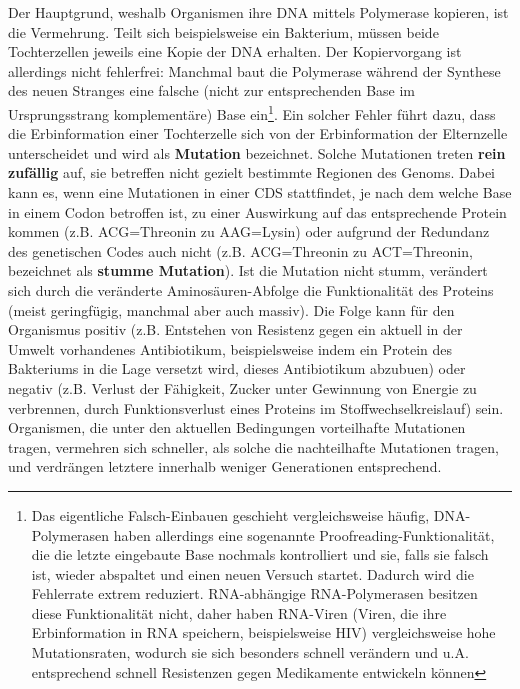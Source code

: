 Der Hauptgrund, weshalb Organismen ihre DNA mittels Polymerase kopieren, ist die Vermehrung. Teilt sich beispielsweise ein Bakterium, müssen beide Tochterzellen jeweils eine Kopie der DNA erhalten. Der Kopiervorgang ist allerdings nicht fehlerfrei: Manchmal baut die Polymerase während der Synthese des neuen Stranges eine falsche (nicht zur entsprechenden Base im Ursprungsstrang komplementäre) Base ein\footnote{Das eigentliche Falsch-Einbauen geschieht vergleichsweise häufig, DNA-Polymerasen haben allerdings eine sogenannte Proofreading-Funktionalität, die die letzte eingebaute Base nochmals kontrolliert und sie, falls sie falsch ist, wieder abspaltet und einen neuen Versuch startet. Dadurch wird die Fehlerrate extrem reduziert. RNA-abhängige RNA-Polymerasen besitzen diese Funktionalität nicht, daher haben RNA-Viren (Viren, die ihre Erbinformation in RNA speichern, beispielsweise HIV) vergleichsweise hohe Mutationsraten, wodurch sie sich besonders schnell verändern und u.A. entsprechend schnell Resistenzen gegen Medikamente entwickeln können}. Ein solcher Fehler führt dazu, dass die Erbinformation einer Tochterzelle sich von der Erbinformation der Elternzelle unterscheidet und wird als \textbf{Mutation} bezeichnet. Solche Mutationen treten \textbf{rein zufällig} auf, sie betreffen nicht gezielt bestimmte Regionen des Genoms. Dabei kann es, wenn eine Mutationen in einer CDS stattfindet, je nach dem welche Base in einem Codon betroffen ist, zu einer Auswirkung auf das entsprechende Protein kommen (z.B. ACG=Threonin zu AAG=Lysin) oder aufgrund der Redundanz des genetischen Codes auch nicht (z.B. ACG=Threonin zu ACT=Threonin, bezeichnet als \textbf{stumme Mutation}). Ist die Mutation nicht stumm, verändert sich durch die veränderte Aminosäuren-Abfolge die Funktionalität des Proteins (meist geringfügig, manchmal aber auch massiv). Die Folge kann für den Organismus positiv (z.B. Entstehen von Resistenz gegen ein aktuell in der Umwelt vorhandenes Antibiotikum, beispielsweise indem ein Protein des Bakteriums in die Lage versetzt wird, dieses Antibiotikum abzubuen) oder negativ (z.B. Verlust der Fähigkeit, Zucker unter Gewinnung von Energie zu verbrennen, durch Funktionsverlust eines Proteins im Stoffwechselkreislauf) sein. Organismen, die unter den aktuellen Bedingungen vorteilhafte Mutationen tragen, vermehren sich schneller, als solche die nachteilhafte Mutationen tragen, und verdrängen letztere innerhalb weniger Generationen entsprechend.

